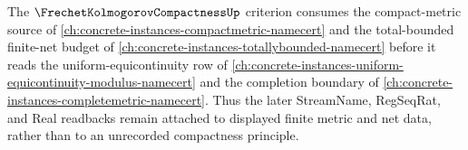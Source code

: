 \begin{theorem}
\label{thm:frechet-kolmogorov-compact-metric-total-bounded-dependency}
The $\FrechetKolmogorovCompactnessUp$ criterion consumes the compact-metric source of \autoref{ch:concrete-instances-compactmetric-namecert} and the total-bounded finite-net budget of \autoref{ch:concrete-instances-totallybounded-namecert} before it reads the uniform-equicontinuity row of \autoref{ch:concrete-instances-uniform-equicontinuity-modulus-namecert} and the completion boundary of \autoref{ch:concrete-instances-completemetric-namecert}. Thus the later StreamName, RegSeqRat, and Real readbacks remain attached to displayed finite metric and net data, rather than to an unrecorded compactness principle.
\end{theorem}
